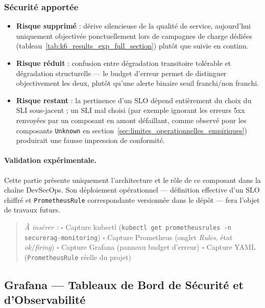 \subsubsection{Sécurité apportée}
\begin{itemize}
    \item \textbf{Risque supprimé} : dérive silencieuse de la qualité de service, aujourd'hui uniquement objectivée ponctuellement lors de campagnes de charge dédiées (tableau~\ref{tab:k6_results_exp_full_section}) plutôt que suivie en continu.
    \item \textbf{Risque réduit} : confusion entre dégradation transitoire tolérable et dégradation structurelle — le budget d'erreur permet de distinguer objectivement les deux, plutôt qu'une alerte binaire seuil franchi/non franchi.
    \item \textbf{Risque restant} : la pertinence d'un SLO dépend entièrement du choix du SLI sous-jacent ; un SLI mal choisi (par exemple ignorant les erreurs 5xx renvoyées par un composant en amont défaillant, comme observé pour les composants \texttt{Unknown} en section~\ref{sec:limites_operationnelles_empiriques}) produirait une fausse impression de conformité.
\end{itemize}

\paragraph{Validation expérimentale.}
Cette partie présente uniquement l'architecture et le rôle de ce composant dans la chaîne DevSecOps. Son déploiement opérationnel — définition effective d'un SLO chiffré et \texttt{PrometheusRule} correspondante versionnée dans le dépôt — fera l'objet de travaux futurs.

\begin{quote}
\scriptsize
\textit{À insérer :} \quad
$\square$ Capture kubectl (\texttt{kubectl get prometheusrules -n securerag-monitoring}) \quad
$\square$ Capture Prometheus (onglet \textit{Rules}, état \textit{ok}/\textit{firing}) \quad
$\square$ Capture Grafana (panneau budget d'erreur) \quad
$\square$ Capture YAML (\texttt{PrometheusRule} réelle du projet)
\end{quote}


\subsection{Grafana — Tableaux de Bord de Sécurité et d'Observabilité}
\label{subsec:grafana_dashboards_v2}

